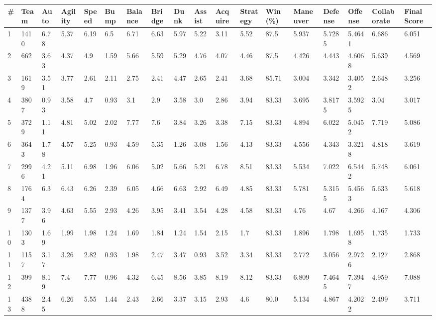 \documentclass[landscape, 10pt]{report}
\begin{document}
\begin{longtable}{l || l || l | l | l | l | l | l | l | l | l | l | l || l | l | l | l | l} 
\# & Team & Auto & Agility & Speed & Bump & Balance & Bridge & Dunk & Assist & Acquire & Strategy & Win (\%) & Maneuver & Defense & Offense & Collaborate & Final Score \\ \hline \endhead 
\rowcolor{lightgray}1 & 1410 & 6.78 & 5.37 & 6.19 & 6.5 & 6.71 & 6.63 & 5.97 & 5.22 & 3.11 & 5.52 & 87.5 & 5.937 & 5.7285 & 5.4641 & 6.686 & 6.051\\ 
2 & 662 & 3.63 & 4.37 & 4.9 & 1.59 & 5.66 & 5.59 & 5.29 & 4.76 & 4.07 & 4.46 & 87.5 & 4.426 & 4.443 & 4.6068 & 5.639 & 4.569\\ 
\rowcolor{lightgray}3 & 1619 & 3.51 & 3.77 & 2.61 & 2.11 & 2.75 & 2.41 & 4.47 & 2.65 & 2.41 & 3.68 & 85.71 & 3.004 & 3.342 & 3.4052 & 2.648 & 3.256\\ 
4 & 3807 & 0.93 & 3.58 & 4.7 & 0.93 & 3.1 & 2.9 & 3.58 & 3.0 & 2.86 & 3.94 & 83.33 & 3.695 & 3.8175 & 3.5925 & 3.04 & 3.017\\ 
\rowcolor{lightgray}5 & 3729 & 1.11 & 4.81 & 5.02 & 2.02 & 7.77 & 7.6 & 3.84 & 3.26 & 3.38 & 7.15 & 83.33 & 4.894 & 6.022 & 5.0452 & 7.719 & 5.086\\ 
6 & 3643 & 1.78 & 4.57 & 5.25 & 0.93 & 4.59 & 5.35 & 1.26 & 3.08 & 1.56 & 4.13 & 83.33 & 4.556 & 4.343 & 3.3218 & 4.818 & 3.619\\ 
\rowcolor{lightgray}7 & 2996 & 4.21 & 5.11 & 6.98 & 1.96 & 6.06 & 5.02 & 5.66 & 5.21 & 6.78 & 8.51 & 83.33 & 5.534 & 7.022 & 6.5442 & 5.748 & 6.061\\ 
8 & 1764 & 6.3 & 6.43 & 6.26 & 2.39 & 6.05 & 4.66 & 6.63 & 2.92 & 6.49 & 4.85 & 83.33 & 5.781 & 5.3155 & 5.4563 & 5.633 & 5.618\\ 
\rowcolor{lightgray}9 & 1377 & 3.96 & 4.63 & 5.55 & 2.93 & 4.26 & 3.95 & 3.41 & 3.54 & 4.28 & 4.58 & 83.33 & 4.76 & 4.67 & 4.266 & 4.167 & 4.306\\ 
10 & 1303 & 1.69 & 1.99 & 1.98 & 1.24 & 1.69 & 1.84 & 1.24 & 1.54 & 2.15 & 1.7 & 83.33 & 1.896 & 1.798 & 1.6958 & 1.735 & 1.733\\ 
\rowcolor{lightgray}11 & 1157 & 3.17 & 3.26 & 2.82 & 0.93 & 1.98 & 2.47 & 3.47 & 0.93 & 3.52 & 3.34 & 83.33 & 2.772 & 3.056 & 2.9726 & 2.127 & 2.868\\ 
12 & 399 & 8.19 & 7.4 & 7.77 & 0.96 & 4.32 & 6.45 & 8.56 & 3.85 & 8.19 & 8.12 & 83.33 & 6.809 & 7.4645 & 7.3947 & 4.959 & 7.088\\ 
\rowcolor{lightgray}13 & 4388 & 2.45 & 6.26 & 5.55 & 1.44 & 2.43 & 2.66 & 3.37 & 3.15 & 2.93 & 4.6 & 80.0 & 5.134 & 4.867 & 4.2022 & 2.499 & 3.711\\ 

\end{longtable}
\end{document}
